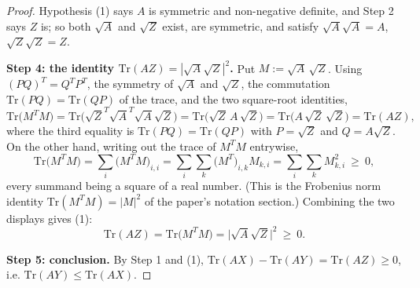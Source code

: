 \begin{proof}
Hypothesis (1) says $A$ is symmetric and non-negative definite, and Step 2 says $Z$ is;
so both $\sqrt A$ and $\sqrt Z$ exist, are symmetric, and satisfy
$\sqrt A\sqrt A=A$, $\sqrt Z\sqrt Z=Z$.

\medskip\noindent\textbf{Step 4: the identity $\mathrm{Tr}(AZ)=|\sqrt A\sqrt Z|^{2}$.} Put
$M:=\sqrt A\,\sqrt Z$. Using $(PQ)^{T}=Q^{T}P^{T}$, the symmetry of $\sqrt A$ and
$\sqrt Z$, the commutation $\mathrm{Tr}(PQ)=\mathrm{Tr}(QP)$ of the trace, and the two
square-root identities,
\[
 \mathrm{Tr}\big(M^{T}M\big)
  =\mathrm{Tr}\big(\sqrt Z^{T}\sqrt A^{T}\sqrt A\sqrt Z\big)
  =\mathrm{Tr}\big(\sqrt Z\,A\,\sqrt Z\big)
  =\mathrm{Tr}\big(A\,\sqrt Z\,\sqrt Z\big)
  =\mathrm{Tr}(AZ),
\]
where the third equality is $\mathrm{Tr}(PQ)=\mathrm{Tr}(QP)$ with $P=\sqrt Z$ and
$Q=A\sqrt Z$. On the other hand, writing out the trace of $M^{T}M$ entrywise,
\[
 \mathrm{Tr}\big(M^{T}M\big)=\sum_{i}\big(M^{T}M\big)_{i,i}
  =\sum_{i}\sum_{k}\big(M^{T}\big)_{i,k}M_{k,i}
  =\sum_{i}\sum_{k}M_{k,i}^{2}\ \ge\ 0,
\]
every summand being a square of a real number. (This is the Frobenius norm identity
$\mathrm{Tr}(M^{T}M)=|M|^{2}$ of the paper's notation section.) Combining the two displays
gives (1):
\[
 \mathrm{Tr}(AZ)=\mathrm{Tr}\big(M^{T}M\big)=\big|\sqrt A\sqrt Z\big|^{2}\ \ge\ 0 .
\]

\medskip\noindent\textbf{Step 5: conclusion.} By Step 1 and (1),
$\mathrm{Tr}(AX)-\mathrm{Tr}(AY)=\mathrm{Tr}(AZ)\ge0$, i.e.
$\mathrm{Tr}(AY)\le\mathrm{Tr}(AX)$.
\end{proof}
